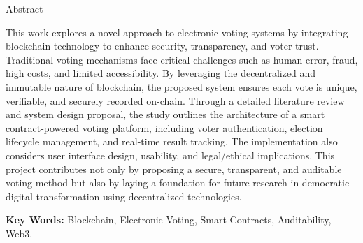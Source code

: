 \begin{center} \large{Abstract} \end{center}

This work explores a novel approach to electronic voting systems by integrating blockchain technology to enhance security, transparency, and voter trust. Traditional voting mechanisms face critical challenges such as human error, fraud, high costs, and limited accessibility. By leveraging the decentralized and immutable nature of blockchain, the proposed system ensures each vote is unique, verifiable, and securely recorded on-chain. Through a detailed literature review and system design proposal, the study outlines the architecture of a smart contract-powered voting platform, including voter authentication, election lifecycle management, and real-time result tracking. The implementation also considers user interface design, usability, and legal/ethical implications. This project contributes not only by proposing a secure, transparent, and auditable voting method but also by laying a foundation for future research in democratic digital transformation using decentralized technologies.

\vspace{0.8cm}
\textbf{Key Words:} Blockchain, Electronic Voting, Smart Contracts, Auditability, Web3.